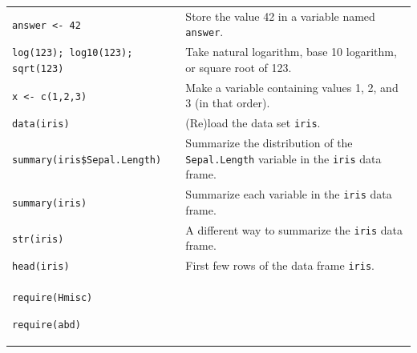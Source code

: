 \vspace{-3mm}
\begin{center}
\begin{longtable}{p{2.45in}p{3.30in}}
\verb!answer <- 42! & Store the value 42 in a variable named \verb!answer!.
\\[3mm]
\verb!log(123); log10(123); sqrt(123)! & Take natural logarithm, base 10 logarithm, or square 
root of 123.
\\[3mm]
\verb!x <- c(1,2,3)! & Make a variable containing values 1, 2, and 3 (in that order).
\\[3mm]
\verb!data(iris)! & (Re)load the data set \verb!iris!.
\\[3mm]
\verb!summary(iris$Sepal.Length)! & 
Summarize the distribution of the \verb!Sepal.Length! variable in the \verb!iris! data
frame.
\\[3mm]
\verb!summary(iris)! & 
Summarize each variable in the \verb!iris! data frame.
\\[3mm]
\verb!str(iris)! & A different way to summarize the \verb!iris! data frame.
\\[3mm]
\verb!head(iris)! & First few rows of the data frame \verb!iris!.
\\[3mm]
\verb!require(Hmisc)!

\verb!require(abd)!


\end{longtable}
\end{center}
